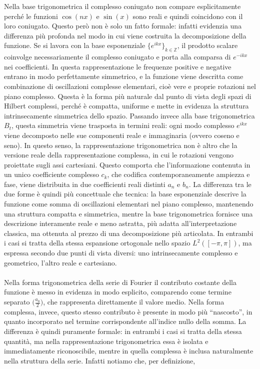 \documentclass[a4paper,12pt]{report}
\begin{document}
Nella base trigonometrica il complesso coniugato non compare esplicitamente perché le funzioni $\cos(nx)$ e $\sin(x)$ sono reali e quindi coincidono con il loro coniugato. Questo però non è solo un fatto formale: infatti evidenzia una differenza più profonda nel modo in cui viene costruita la decomposizione della funzione. Se si lavora con la base esponenziale $\{e^{ikx}\}_{k\in \mathbb{Z}}$, il prodotto scalare coinvolge necessariamente il complesso coniugato e porta alla comparsa di $e^{-ikx}$ nei coefficienti. In questa rappresentazione le frequenze positive e negative entrano in modo perfettamente simmetrico, e la funzione viene descritta come combinazione di oscillazioni complesse elementari, cioè vere e proprie rotazioni nel piano complesso. Questa è la forma più naturale dal punto di vista degli spazi di Hilbert complessi, perché è compatta, uniforme e mette in evidenza la struttura intrinsecamente simmetrica dello spazio. Passando invece alla base trigonometrica $B_t$, questa simmetria viene trasposta in termini reali: ogni modo complesso $e^{ikx}$ viene decomposto nelle sue componenti reale e immaginaria (ovvero coseno e seno). In questo senso, la rappresentazione trigonometrica non è altro che la versione reale della rappresentazione complessa, in cui le rotazioni vengono proiettate sugli assi cartesiani. Questo comporta che l’informazione contenuta in un unico coefficiente complesso $c_k$, che codifica contemporaneamente ampiezza e fase, viene distribuita in due coefficienti reali distinti $a_n$ e $b_n$. La differenza tra le due forme è quindi più concettuale che tecnica: la base esponenziale descrive la funzione come somma di oscillazioni elementari nel piano complesso, mantenendo una struttura compatta e simmetrica, mentre la base trigonometrica fornisce una descrizione interamente reale e meno astratta, più adatta all’interpretazione classica, ma ottenuta al prezzo di una decomposizione più articolata. In entrambi i casi si tratta della stessa espansione ortogonale nello spazio $L^2([-\pi,\pi])$, ma espressa secondo due punti di vista diversi: uno intrinsecamente complesso e geometrico, l’altro reale e cartesiano.
\\
\\ Nella forma trigonometrica della serie di Fourier il contributo costante della funzione è messo in evidenza in modo esplicito, comparendo come termine separato $\bigg(\frac{a_0}{2}\bigg)$, che rappresenta direttamente il valore medio. Nella forma complessa, invece, questo stesso contributo è presente in modo più “nascosto”, in quanto incorporato nel termine corrispondente all’indice nullo della somma. La differenza è quindi puramente formale: in entrambi i casi si tratta della stessa quantità, ma nella rappresentazione trigonometrica essa è isolata e immediatamente riconoscibile, mentre in quella complessa è inclusa naturalmente nella struttura della serie. Infatti notiamo che, per definizione,
\end{document}
